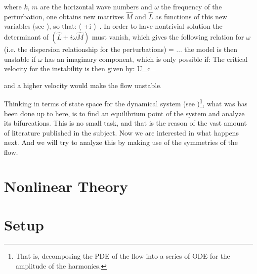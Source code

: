 where $k$, $m$ are the horizontal wave numbers and $\omega$ the frequency
of the perturbation, one obtains new matrixes $\hat{M}$ and $\hat{L}$ as
functions of this new variables (see ), so that:
\beq
\left( +i \omega {}\right) 
\,.
In order to have nontrivial solution the determinant of $\left( \hat{L}+i
\omega \hat{M}\right)$ must vanish, which gives the following relation
for $\omega$ (i.e. the dispersion relationship for the
perturbations)
\beq
\omega = ...%
the model is then unstable if $\omega$ has an imaginary component, which is only possible if:
\beq
The critical velocity for the instability is then given by:
\beq
U_c=%

and a higher velocity would make the flow unstable.

Thinking in terms of state space for the dynamical system (see
)\footnote{
    That is, decomposing the PDE of the flow into
    a series of ODE for the amplitude of the harmonics.
}, what was has been done up to here, is to find an equilibrium point of
the system and analyze its bifurcations. This is no small task, and that
is the reason of the vast amount of literature published in the subject.
Now we are interested in what happens next. And we will try to analyze
this by making use of the symmetries of the flow.

\section{Nonlinear Theory}
\label{s:nonlinear}

\section{Setup}
\label{s:setup}
